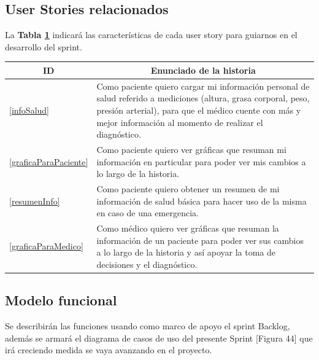 \documentclass[a4paper,12pt]{article}
\begin{document}
\subsection{User Stories relacionados}
La \textbf{Tabla \ref{US-Sprint4} } indicará las características de cada user story para guiarnos en el desarrollo del sprint.

\begin{table}[h]
    \label{US-Sprint4}
    \centering
	\begin{tabular}{|l|p{14cm}|}
	\hline
        \multicolumn{1}{|c|}{\textbf{ID}} &
        \multicolumn{1}{|c|}{\textbf{Enunciado de la historia}} \\          
    \hline
       \ref{infoSalud} &
       Como paciente quiero cargar mi información personal de salud referido a mediciones (altura, grasa corporal, peso, presión arterial), para que el médico cuente con más y mejor información al momento de realizar el diagnóstico. 
    
       
       \\
       \hline
	    \ref{graficaParaPaciente} &
	    Como paciente quiero ver gráficas que resuman mi información en particular para poder ver mis cambios a lo largo de la historia. 

	    
	    \\
	    \hline
	    \ref{resumenInfo} &
	    Como paciente quiero obtener un resumen de mi información de salud básica para hacer uso de la misma en caso de una emergencia. 

	    
	    \\
	   \hline      
        \ref{graficaParaMedico} & Como médico quiero ver gráficas que resuman la información de un paciente para poder ver sus cambios a lo largo de la historia y así apoyar la toma de decisiones y el diagnóstico.\\
    \hline
    \end{tabular}

\end{table}

\subsection{Modelo funcional} 
Se describirán las funciones usando como marco de apoyo el sprint Backlog,
además se armará el diagrama de casos de uso del presente Sprint [Figura 44] que
irá creciendo medida se vaya avanzando en el proyecto.

\end{document}

